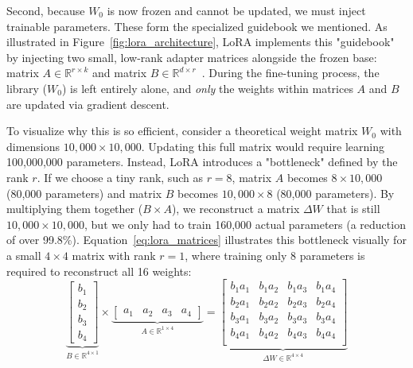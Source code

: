 Second, because $W_0$ is now frozen and cannot be updated, we must inject trainable parameters. These form the specialized guidebook we mentioned. As illustrated in Figure~\ref{fig:lora_architecture}, LoRA implements this "guidebook" by injecting two small, low-rank adapter matrices alongside the frozen base: matrix $A \in \mathbb{R}^{r \times k}$ and matrix $B \in \mathbb{R}^{d \times r}$~\parencite{Hu_Shen_Wallis_Allen-Zhu_Li_Wang_Wang_Chen_2021, Dettmers_Pagnoni_Holtzman_Zettlemoyer_2023}. During the fine-tuning process, the library ($W_0$) is left entirely alone, and \emph{only} the weights within matrices $A$ and $B$ are updated via gradient descent.

To visualize why this is so efficient, consider a theoretical weight matrix $W_0$ with dimensions $10,000 \times 10,000$. Updating this full matrix would require learning 100,000,000 parameters. Instead, LoRA introduces a "bottleneck" defined by the rank $r$. If we choose a tiny rank, such as $r=8$, matrix $A$ becomes $8 \times 10,000$ (80,000 parameters) and matrix $B$ becomes $10,000 \times 8$ (80,000 parameters). By multiplying them together ($B \times A$), we reconstruct a matrix $\Delta W$ that is still $10,000 \times 10,000$, but we only had to train 160,000 actual parameters (a reduction of over 99.8\%). Equation~\ref{eq:lora_matrices} illustrates this bottleneck visually for a small $4 \times 4$ matrix with rank $r=1$, where training only 8 parameters is required to reconstruct all 16 weights:
\begin{equation}
\label{eq:lora_matrices}
    \underbrace{\begin{bmatrix}
    b_1 \\ b_2 \\ b_3 \\ b_4
    \end{bmatrix}}_{B \in \mathbb{R}^{4 \times 1}}
    \times
    \underbrace{\begin{bmatrix}
    a_1 & a_2 & a_3 & a_4
    \end{bmatrix}}_{A \in \mathbb{R}^{1 \times 4}}
    =
    \underbrace{\begin{bmatrix}
    b_1 a_1 & b_1 a_2 & b_1 a_3 & b_1 a_4 \\
    b_2 a_1 & b_2 a_2 & b_2 a_3 & b_2 a_4 \\
    b_3 a_1 & b_3 a_2 & b_3 a_3 & b_3 a_4 \\
    b_4 a_1 & b_4 a_2 & b_4 a_3 & b_4 a_4 \\
    \end{bmatrix}}_{\Delta W \in \mathbb{R}^{4 \times 4}}
\end{equation}

